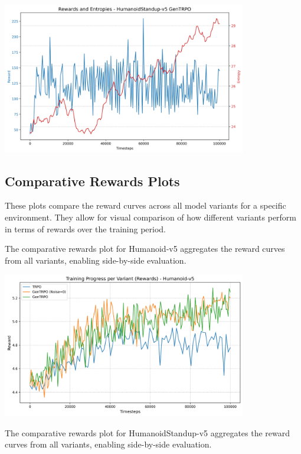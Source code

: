 \documentclass{svproc}
\begin{document}
\begin{center}
\includegraphics[width=0.8\textwidth]{graph_HumanoidStandup-v5_gentrpo-ne_rewards_entropies.png}
\end{center}

\subsection{Comparative Rewards Plots}
These plots compare the reward curves across all model variants for a specific environment. They allow for visual comparison of how different variants perform in terms of rewards over the training period.

The comparative rewards plot for Humanoid-v5 aggregates the reward curves from all variants, enabling side-by-side evaluation.

\begin{center}
\includegraphics[width=0.8\textwidth]{graph_rewards_Humanoid-v5.png}
\end{center}

The comparative rewards plot for HumanoidStandup-v5 aggregates the reward curves from all variants, enabling side-by-side evaluation.
\end{document}

